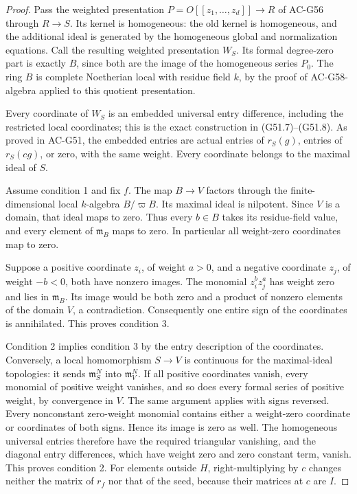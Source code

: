 \begin{proof}
Pass the weighted presentation
\(P=O[[z_1,\ldots,z_d]]\to R\) of AC-G56 through
\(R\to S\).
Its kernel is homogeneous: the old kernel is homogeneous,
and the additional ideal is generated by the homogeneous
global and normalization equations.
Call the resulting weighted presentation \(W_S\).
Its formal degree-zero part is exactly \(B\), since
both are the image of the homogeneous series \(P_0\).
The ring \(B\) is complete Noetherian local with residue
field \(k\), by the proof of AC-G58-algebra applied to
this quotient presentation.

Every coordinate of \(W_S\) is an embedded universal
entry difference, including the restricted local
coordinates; this is the exact construction in
(G51.7)--(G51.8).
As proved in AC-G51, the embedded entries are actual
entries of \(r_S(g)\), entries of \(r_S(cg)\), or zero,
with the same weight.
Every coordinate belongs to the maximal ideal of \(S\).

Assume condition 1 and fix \(f\).
The map \(B\to V\) factors through the finite-dimensional
local \(k\)-algebra \(B/\varpi B\).
Its maximal ideal is nilpotent.  Since \(V\) is a domain,
that ideal maps to zero.
Thus every \(b\in B\) takes its residue-field value,
and every element of \(\mathfrak m_B\) maps to zero.
In particular all weight-zero coordinates map to zero.

Suppose a positive coordinate \(z_i\), of weight \(a>0\),
and a negative coordinate \(z_j\), of weight \(-b<0\),
both have nonzero images.
The monomial \(z_i^b z_j^a\) has weight zero and lies in
\(\mathfrak m_B\).
Its image would be both zero and a product of nonzero
elements of the domain \(V\), a contradiction.
Consequently one entire sign of the coordinates is
annihilated.  This proves condition 3.

Condition 2 implies condition 3 by the entry description
of the coordinates.
Conversely, a local homomorphism \(S\to V\) is continuous
for the maximal-ideal topologies: it sends
\(\mathfrak m_S^N\) into \(\mathfrak m_V^N\).
If all positive coordinates vanish, every monomial of
positive weight vanishes, and so does every formal
series of positive weight, by convergence in \(V\).
The same argument applies with signs reversed.
Every nonconstant zero-weight monomial contains either
a weight-zero coordinate or coordinates of both signs.
Hence its image is zero as well.
The homogeneous universal entries therefore have the
required triangular vanishing, and the diagonal entry
differences, which have weight zero and zero constant
term, vanish.
This proves condition 2.
For elements outside \(H\), right-multiplying by \(c\) changes
neither the matrix of \(r_f\) nor that of the seed,
because their matrices at \(c\) are \(I\).


\end{proof}
